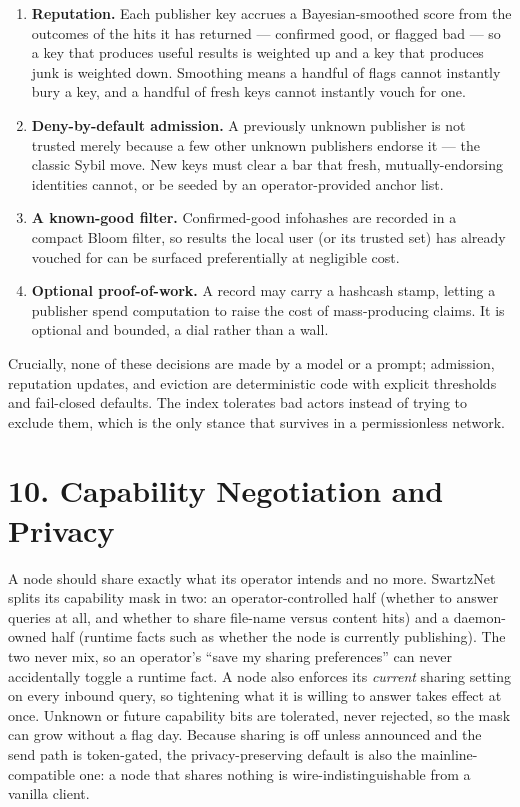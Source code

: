 \documentclass[11pt]{article}
\providecommand{\tightlist}{\setlength{\itemsep}{0pt}\setlength{\parskip}{0pt}}
\begin{document}
\begin{enumerate}
\def\labelenumi{\arabic{enumi}.}
\tightlist
\item
  \textbf{Reputation.} Each publisher key accrues a Bayesian-smoothed
  score from the outcomes of the hits it has returned --- confirmed
  good, or flagged bad --- so a key that produces useful results is
  weighted up and a key that produces junk is weighted down. Smoothing
  means a handful of flags cannot instantly bury a key, and a handful of
  fresh keys cannot instantly vouch for one.
\item
  \textbf{Deny-by-default admission.} A previously unknown publisher is
  not trusted merely because a few other unknown publishers endorse it
  --- the classic Sybil move. New keys must clear a bar that fresh,
  mutually-endorsing identities cannot, or be seeded by an
  operator-provided anchor list.
\item
  \textbf{A known-good filter.} Confirmed-good infohashes are recorded
  in a compact Bloom filter, so results the local user (or its trusted
  set) has already vouched for can be surfaced preferentially at
  negligible cost.
\item
  \textbf{Optional proof-of-work.} A record may carry a hashcash stamp,
  letting a publisher spend computation to raise the cost of
  mass-producing claims. It is optional and bounded, a dial rather than
  a wall.
\end{enumerate}

Crucially, none of these decisions are made by a model or a prompt;
admission, reputation updates, and eviction are deterministic code with
explicit thresholds and fail-closed defaults. The index tolerates bad
actors instead of trying to exclude them, which is the only stance that
survives in a permissionless network.

\hypertarget{capability-negotiation-and-privacy}{%
\section{10. Capability Negotiation and
Privacy}\label{capability-negotiation-and-privacy}}

A node should share exactly what its operator intends and no more.
SwartzNet splits its capability mask in two: an operator-controlled half
(whether to answer queries at all, and whether to share file-name versus
content hits) and a daemon-owned half (runtime facts such as whether the
node is currently publishing). The two never mix, so an operator's
``save my sharing preferences'' can never accidentally toggle a runtime
fact. A node also enforces its \emph{current} sharing setting on every
inbound query, so tightening what it is willing to answer takes effect
at once. Unknown or future capability bits are tolerated, never
rejected, so the mask can grow without a flag day. Because sharing is
off unless announced and the send path is token-gated, the
privacy-preserving default is also the mainline-compatible one: a node
that shares nothing is wire-indistinguishable from a vanilla client.
\end{document}
